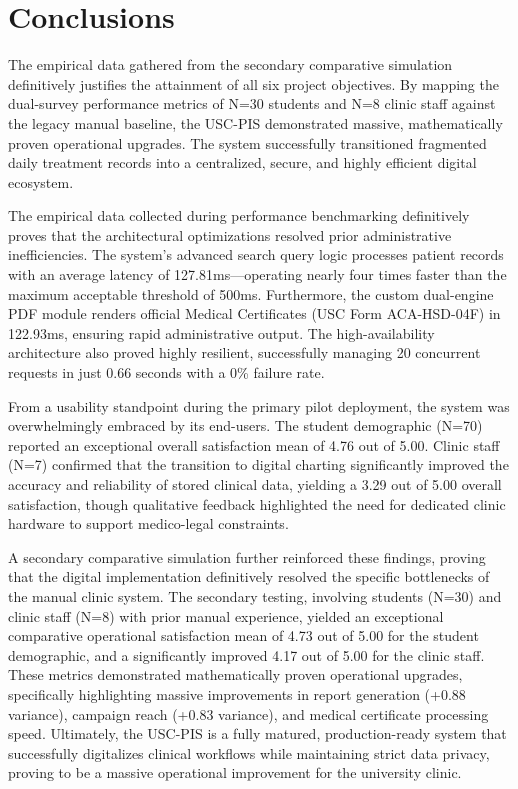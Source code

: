\section{Conclusions}
The empirical data gathered from the secondary comparative simulation definitively justifies the attainment of all six project objectives. By mapping the dual-survey performance metrics of N=30 students and N=8 clinic staff against the legacy manual baseline, the USC-PIS demonstrated massive, mathematically proven operational upgrades. The system successfully transitioned fragmented daily treatment records into a centralized, secure, and highly efficient digital ecosystem.

The empirical data collected during performance benchmarking definitively proves that the architectural optimizations resolved prior administrative inefficiencies. The system's advanced search query logic processes patient records with an average latency of 127.81ms—operating nearly four times faster than the maximum acceptable threshold of 500ms. Furthermore, the custom dual-engine PDF module renders official Medical Certificates (USC Form ACA-HSD-04F) in 122.93ms, ensuring rapid administrative output. The high-availability architecture also proved highly resilient, successfully managing 20 concurrent requests in just 0.66 seconds with a 0\% failure rate.

From a usability standpoint during the primary pilot deployment, the system was overwhelmingly embraced by its end-users. The student demographic (N=70) reported an exceptional overall satisfaction mean of 4.76 out of 5.00. Clinic staff (N=7) confirmed that the transition to digital charting significantly improved the accuracy and reliability of stored clinical data, yielding a 3.29 out of 5.00 overall satisfaction, though qualitative feedback highlighted the need for dedicated clinic hardware to support medico-legal constraints.

A secondary comparative simulation further reinforced these findings, proving that the digital implementation definitively resolved the specific bottlenecks of the manual clinic system. The secondary testing, involving students (N=30) and clinic staff (N=8) with prior manual experience, yielded an exceptional comparative operational satisfaction mean of 4.73 out of 5.00 for the student demographic, and a significantly improved 4.17 out of 5.00 for the clinic staff. These metrics demonstrated mathematically proven operational upgrades, specifically highlighting massive improvements in report generation (+0.88 variance), campaign reach (+0.83 variance), and medical certificate processing speed. Ultimately, the USC-PIS is a fully matured, production-ready system that successfully digitalizes clinical workflows while maintaining strict data privacy, proving to be a massive operational improvement for the university clinic.

